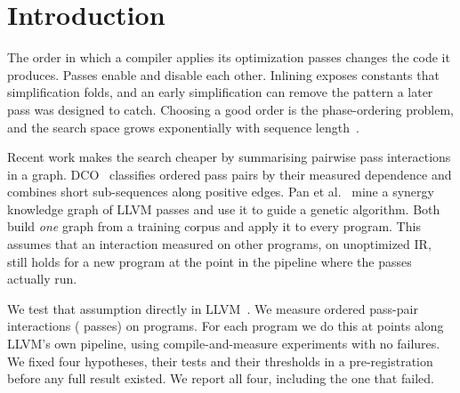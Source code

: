 \section{Introduction}

The order in which a compiler applies its optimization passes changes the code it produces.
Passes enable and disable each other. Inlining exposes constants that simplification folds, and
an early simplification can remove the pattern a later pass was designed to catch. Choosing a good
order is the phase-ordering problem, and the search space grows exponentially with sequence
length~\cite{almagor2004,kulkarni2012,ashouri2018survey}.

Recent work makes the search cheaper by summarising pairwise pass interactions in a graph.
DCO~\cite{dco2024} classifies ordered pass pairs by their measured dependence and combines short
sub-sequences along positive edges. Pan et al.~\cite{pan2025synergy} mine a synergy knowledge graph
of LLVM passes and use it to guide a genetic algorithm. Both build \emph{one} graph from a training
corpus and apply it to every program. This assumes that an interaction measured on other programs,
on unoptimized IR, still holds for a new program at the point in the pipeline where the passes
actually run.

We test that assumption directly in LLVM~\LLVMVersion. We measure \NPairs{} ordered pass-pair
interactions (\NPasses{} passes) on \NPrograms{} programs. For each program we do this at
\NSnapshots{} points along LLVM's own \Otwo{} pipeline, using \NExperiments{} compile-and-measure
experiments with no failures. We fixed four hypotheses, their tests and their thresholds in a
pre-registration before any full result existed. We report all four, including the one that
failed.

